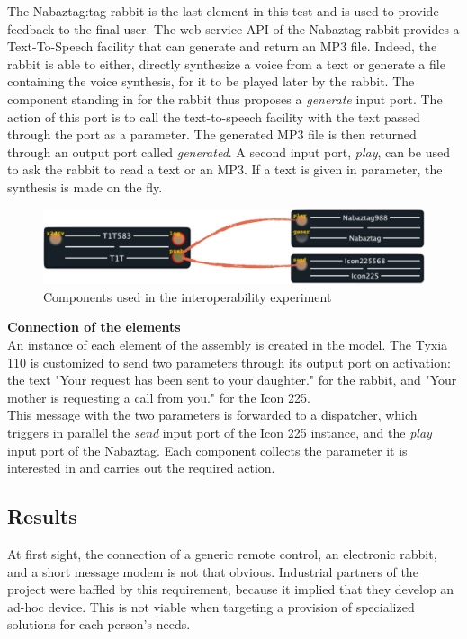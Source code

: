 The Nabaztag:tag rabbit is the last element in this test and is used to provide feedback to the final user. The web-service API of the Nabaztag rabbit provides a Text-To-Speech facility that can generate and return an MP3 file. Indeed, the rabbit is able to either, directly synthesize a voice from a text or generate a file containing the voice synthesis, for it to be played later by the rabbit. The component standing in for the rabbit thus proposes a {\it generate} input port. The action of this port is to call the text-to-speech facility with the text passed through the port as a parameter. The generated MP3 file is then returned through an output port called {\it generated}. A second input port, {\it play}, can be used to ask the rabbit to read a text or an MP3. If a text is given in parameter, the synthesis is made on the fly.\\

\begin{figure}[h!]
\centering
\includegraphics[width=.7\textwidth]{part4/pics/validInterop}
\caption{Components used in the interoperability experiment}
\end{figure}

{\bf Connection of the elements}\\

An instance of each element of the assembly is created in the model. The Tyxia 110 is customized to send two parameters through its output port on activation: the text "Your request has been sent to your daughter." for the rabbit, and "Your mother is requesting a call from you." for the Icon 225.\\
This message with the two parameters is forwarded to a dispatcher, which triggers in parallel the {\it send} input port of the Icon 225 instance, and the {\it play} input port of the Nabaztag. Each component collects the parameter it is interested in and carries out the required action.\\

\subsection{Results}

At first sight, the connection of a generic remote control, an electronic rabbit, and a short message modem is not that obvious. Industrial partners of the project were baffled by this requirement, because it implied that they develop an ad-hoc device. This is not viable when targeting a provision of specialized solutions for each person's needs.\\

